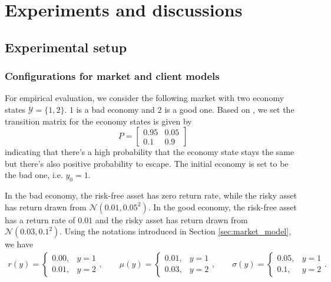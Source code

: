 \chapter{Experiments and discussions}
\section{Experimental setup}\label{sec:setup}

\subsection{Configurations for market and client models}
For empirical evaluation, we consider the following market with two economy states $\mathcal Y=\{1,2\}$. $1$ is a bad economy and $2$ is a good one. Based on , we set the transition matrix for the economy states is given by $$P=\begin{bmatrix}
0.95 & 0.05\\
0.1 & 0.9
\end{bmatrix}$$ indicating that there's a high probability that the economy state stays the same but there's also positive probability to escape. The initial economy is set to be the bad one, i.e. $y_0=1$.

In the bad economy, the risk-free asset has zero return rate, while the risky asset has return drawn from $\mathcal N(0.01,0.05^2)$. In the good economy, the risk-free asset has a return rate of $0.01$ and the risky asset has return drawn from $\mathcal N(0.03, 0.1^2)$. Using the notations introduced in Section \ref{sec:market_model}, we have
    \begin{align*}
    r(y)=\begin{cases}0.00,&y=1\\
    0.01, & y=2
    \end{cases},\qquad
    \mu(y)=\begin{cases}0.01,&y=1\\
    0.03, & y=2
    \end{cases},\qquad
    \sigma(y)=\begin{cases}0.05,&y=1\\
    0.1, & y=2
    \end{cases}.\qquad
    \end{align*}


